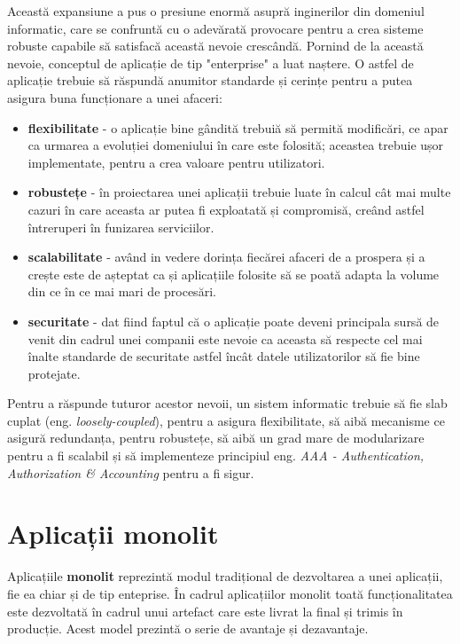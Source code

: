 \documentclass[12pt, a4paper, oneside, romanian]{teza-upb}
\begin{document}
Această expansiune a pus o presiune enormă asupră inginerilor din domeniul informatic, care se confruntă cu o adevărată provocare pentru a crea sisteme robuste capabile să satisfacă această nevoie crescândă. Pornind de la această nevoie, conceptul de aplicație de tip "enterprise" a luat naștere. O astfel de aplicație trebuie să răspundă anumitor standarde și cerințe pentru a putea asigura buna funcționare a unei afaceri:
\begin{itemize}
 \item \textbf{flexibilitate} - o aplicație bine gândită trebuiă să permită modificări, ce apar ca urmarea a evoluției domeniului în care este folosită; aceastea trebuie ușor implementate, pentru a crea valoare pentru utilizatori.
 \item \textbf{robustețe} - în proiectarea unei aplicații trebuie luate în calcul cât mai multe cazuri în care aceasta ar putea fi exploatată și compromisă, creând astfel întreruperi în funizarea serviciilor.
 \item \textbf{scalabilitate} - având in vedere dorința fiecărei afaceri de a prospera și a crește este de așteptat ca și aplicațiile folosite să se poată adapta la volume din ce în ce mai mari de procesări. 
 \item \textbf{securitate} - dat fiind faptul că o aplicație poate deveni principala sursă de venit din cadrul unei companii este nevoie ca aceasta să respecte cel mai înalte standarde de securitate astfel încât datele utilizatorilor să fie bine protejate. 
\end{itemize}

Pentru a răspunde tuturor acestor nevoii, un sistem informatic trebuie să fie slab cuplat (eng. \textit{loosely-coupled}), pentru a asigura flexibilitate, să aibă mecanisme ce asigură redundanța, pentru robustețe, să aibă un grad mare de modularizare pentru a fi scalabil și să implementeze principiul eng. \textit{AAA - Authentication, Authorization \& Accounting} pentru a fi sigur.


\chapter{Aplicații monolit}

Aplicațiile \textbf{monolit} reprezintă modul tradițional de dezvoltarea a unei aplicații, fie ea chiar și de tip enteprise. În cadrul aplicațiilor monolit toată funcționalitatea este dezvoltată în cadrul unui artefact care este livrat la final și trimis în producție. Acest model prezintă o serie de avantaje și dezavantaje. 
\end{document}
